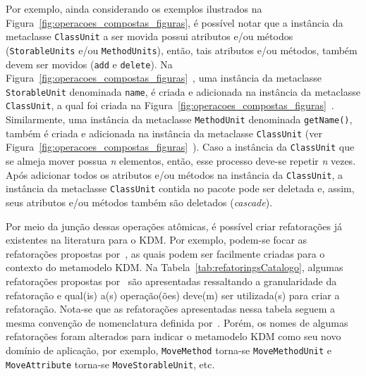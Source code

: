 Por exemplo, ainda considerando os exemplos ilustrados na Figura~\ref{fig:operacoes_compostas_figuras}, é possível notar que a instância da metaclasse \texttt{ClassUnit} a ser movida possui atributos e/ou métodos (\texttt{StorableUnits} e/ou \texttt{MethodUnits}), então, tais atributos e/ou métodos, também devem ser movidos (\texttt{add} e \texttt{delete}). Na Figura~\ref{fig:operacoes_compostas_figuras}~, uma instância da metaclasse \texttt{StorableUnit} denominada \texttt{name}, é criada e adicionada na instância da metaclasse \texttt{ClassUnit}, a qual foi criada na Figura~\ref{fig:operacoes_compostas_figuras}~. Similarmente, uma instância da metaclasse \texttt{MethodUnit} denominada \texttt{getName()}, também é criada e adicionada na instância da metaclasse \texttt{ClassUnit} (ver Figura~\ref{fig:operacoes_compostas_figuras}~). Caso a instância da \texttt{ClassUnit} que se almeja mover possua \textit{n} elementos, então, esse processo deve-se repetir \textit{n} vezes. Após adicionar todos os atributos e/ou métodos na instância da \texttt{ClassUnit}, a instância da metaclasse \texttt{ClassUnit} contida no pacote  pode ser deletada e, assim, seus atributos e/ou métodos também são deletados (\textit{cascade}).



Por meio da junção dessas operações atômicas, é possível criar refatorações já existentes na literatura para o KDM. Por exemplo, podem-se focar as refatorações propostas por~, as quais podem ser facilmente criadas para o contexto do metamodelo KDM. Na Tabela~\ref{tab:refatoringsCatalogo}, algumas refatorações propostas por~ são apresentadas ressaltando a granularidade da refatoração e qual(is) a(s) operação(ões) deve(m) ser utilizada(s) para criar a refatoração. Nota-se que as refatorações apresentadas nessa tabela seguem a mesma convenção de nomenclatura definida por~. Porém, os nomes de algumas refatorações foram alterados para indicar o metamodelo KDM como seu novo domínio de aplicação, por exemplo, \texttt{MoveMethod} torna-se \texttt{MoveMethodUnit} e \texttt{MoveAttribute} torna-se \texttt{MoveStorableUnit}, etc.



